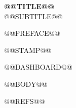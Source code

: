 \documentclass[10pt,twoside]{article}
\begin{document}
\begin{center}
{\LARGE\bfseries @@TITLE@@}\\[6pt]
{\large @@SUBTITLE@@}
\end{center}
\medskip

@@PREFACE@@

\par\medskip
{\footnotesize\textcolor{NoteGray}{@@STAMP@@}}

@@DASHBOARD@@

@@BODY@@

@@REFS@@
\end{document}
